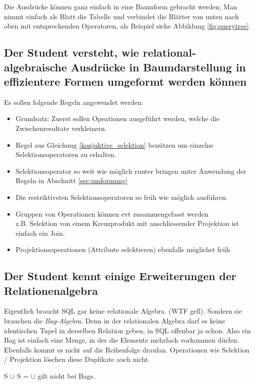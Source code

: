 Die Ausdrücke können ganz einfach in eine Baumform gebracht werden; Man nimmt einfach als Blatt die Tabelle und verbindet die Blätter von unten nach oben mit entsprechenden Operatoren, als Beispiel siehe Abbildung \ref{fig:querytree}.


\subsection{Der Student versteht, wie relational-algebraische Ausdrücke in Baumdarstellung in effizientere Formen umgeformt werden können}

Es sollen folgende Regeln angewendet werden:

\begin{itemize}
  \item Grundsatz: Zuerst sollen Opeationen ausgeführt werden, welche die Zwischenresultate verkleinern.
  \item Regel aus Gleichung \ref{konjuktive_selektion} benützen um einzelne Selektionsoperatoren zu erhalten.
  \item Selektionsoperator so weit wie möglich runter bringen unter Anwendung der Regeln in Abschnitt \ref{sec:umformung}
  \item Die restriktivsten Selektionsoperatoren so früh wie möglich ausführen.
  \item Gruppen von Operationen können evt zusammengefasst werden \\
  z.B. Selektion von einem Kreuzprodukt mit anschliessender Projektion ist einfach ein Join.
  \item Projektionsoperationen (Attribute selektieren) ebenfalls möglichst früh
\end{itemize}


\subsection{Der Student kennt einige Erweiterungen der Relationenalgebra}
Eigentlich braucht SQL gar keine relationale Algebra. (WTF gell). Sondern sie brauchen die \textit{Bag-Algebra}. Denn in der relationalen Algebra darf es keine identischen Tupel in derselben Relation geben, in SQL offenbar ja schon. Also ein Bag ist einfach eine Menge, in der die Elemente mehrfach vorkommen dürfen. Ebenfalls kommt es nicht auf die Reihenfolge draufan. Operationen wie Selektion / Projektion löschen diese Duplikate auch nicht.

S \(\cup\) S = \(\cup\) gilt nicht bei Bags.